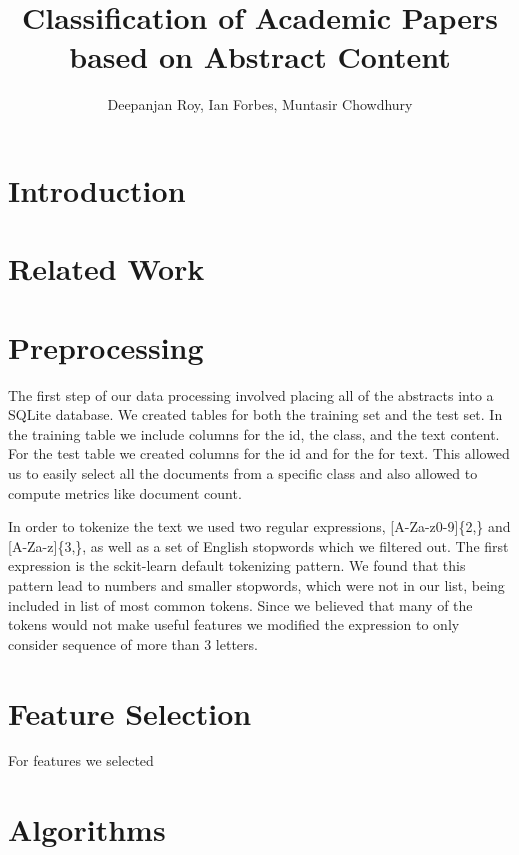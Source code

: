 \documentclass[10pt,twocolumn]{article}
\title {Classification of Academic Papers based on Abstract Content}
\author {Deepanjan Roy, Ian Forbes, Muntasir Chowdhury}
\begin{document}

\section{Introduction}
\section{Related Work}
\section{Preprocessing}
The first step of our data processing involved placing all of the abstracts into a SQLite database. We created tables for both the training set and the test set. In the training table we include columns for the id, the class, and the text content. For the test table we created columns for the id and for the for text. This allowed us to easily select all the documents from a specific class and also allowed to compute metrics like document count.

In order to tokenize the text we used two regular expressions, [A-Za-z0-9]\{2,\} and [A-Za-z]\{3,\}, as well as a set of English stopwords which we filtered out. The first expression is the sckit-learn default tokenizing pattern. We found that this pattern lead to numbers and smaller stopwords, which were not in our list, being included in list of most common tokens. Since we believed that many of the tokens would not make useful features we modified the expression to only consider sequence of  more than 3 letters.
\section{Feature Selection}
For features we selected 
\section{Algorithms}
\end{document}
